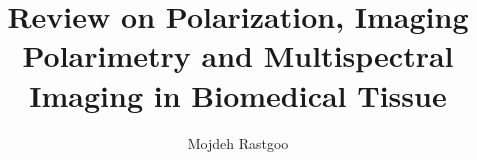 \documentclass[oneside,a4,12p]{report} %
\begin{document}

\title{ Review on Polarization, Imaging Polarimetry and Multispectral Imaging in Biomedical Tissue}


%
%
\author{Mojdeh Rastgoo}


%
%
%
\maketitle


\end{document}
